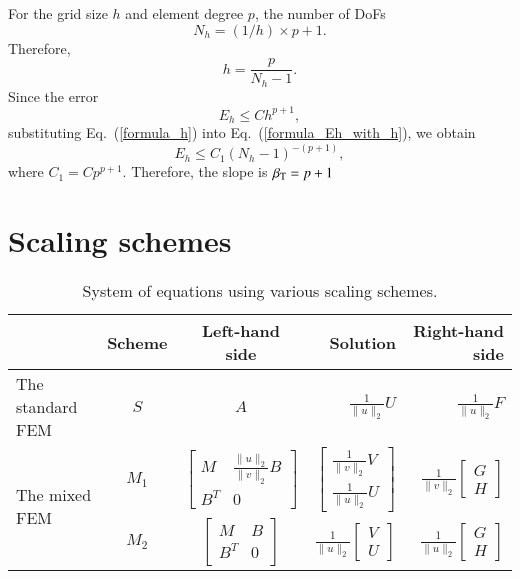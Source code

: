 \documentclass[review,3p]{elsarticle}
\begin{document}
For the grid size $h$ and element degree $p$, the number of DoFs
\begin{equation}
N_h=(1/h) \times p+1.			\label{formula_Nh}
\end{equation}
Therefore,
\begin{equation}
h=\frac{p}{N_h-1}.		\label{formula_h}
\end{equation}
Since the error \cite{gockenbach2006understanding}
\begin{equation}
E_h \leqslant Ch^{p+1},			\label{formula_Eh_with_h}
\end{equation}
substituting Eq.~(\ref{formula_h}) into Eq.~(\ref{formula_Eh_with_h}), we obtain
\begin{equation}
E_h \leqslant C_1(N_h-1)^{-(p+1)},			\label{formula_Eh_with_Nh}
\end{equation}
where $C_1=C p^{p+1}$. Therefore, the slope is $\beta_{\rm T}=p+1$

\section{Scaling schemes}

\begin{table}[!ht]
\small
\centering
\caption [sss] {System of equations using various scaling schemes.}
\label{scaling_schemes_std_and_mix_FEM} 
\begin{tabular}{l c c r r}
\hline  
 & Scheme & Left-hand side & Solution & Right-hand side \\	\hline
The standard FEM & $S$ & {$A$} & $\frac{1}{\|u\|_{2}} U$ & $\frac{1}{\|u\|_{2}} F$ \\	\hline
\multirow{3}{*}{The mixed FEM} & $M_1$ & {$\left[ \begin{array}{cc} M & \frac{\|u\|_{2}}{\|v\|_{2}} B  \\ B^T & 0 \end{array}\right]$ } & $\left[ \begin{array}{cc} \frac{1}{\|v\|_{2}} {V} \\ \frac{1}{\|u\|_{2}} {U} \end{array}\right]$ & $\frac{1}{\|v\|_{2}}\left[ \begin{array}{cc} G \\ { H} \end{array}\right]$ 	\\	\cline{2-5}
 & $M_2$ & {$\left[ \begin{array}{cc} M & B  \\ B^T & 0 \end{array}\right]$ } & $\frac{1}{\|u\|_{2}} \left[ \begin{array}{cc} {V} \\ {U} \end{array}\right]$ & $\frac{1}{\|u\|_{2}} \left[ \begin{array}{cc}  G \\ H \end{array}\right]$ \\	\hline
\end{tabular}
\end{table}
\newpage

  

\end{document}
